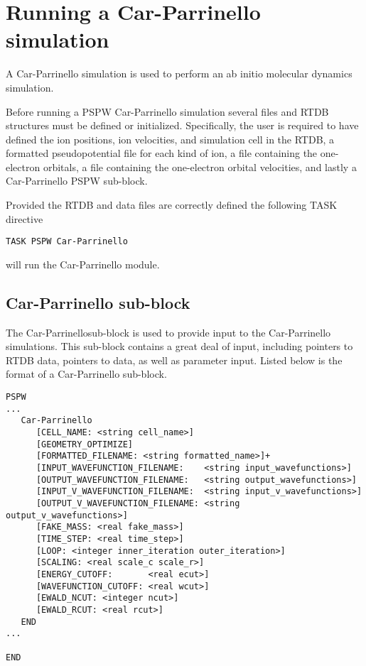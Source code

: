 \section{Running a Car-Parrinello simulation}

A Car-Parrinello simulation is used to perform an ab initio molecular
dynamics simulation.  

Before running a PSPW Car-Parrinello  simulation several files and
RTDB structures must be defined or initialized.  Specifically, the user 
is required to have defined the ion positions, ion velocities, and 
simulation cell in the RTDB, a formatted pseudopotential file for each 
kind of ion, a file containing the one-electron orbitals, a file containing 
the one-electron orbital velocities, and lastly a Car-Parrinello 
PSPW sub-block. 

Provided the RTDB and data files are correctly defined
the following TASK directive
\begin{verbatim}
TASK PSPW Car-Parrinello
\end{verbatim}
will run the Car-Parrinello module.


\subsection{Car-Parrinello  sub-block}
The Car-Parrinellosub-block is used to provide input to the
Car-Parrinello simulations.  This sub-block contains a great deal
of input, including pointers to RTDB data, pointers to data, as well as
parameter input.  Listed below is the format of a Car-Parrinello sub-block.
\begin{verbatim}
PSPW
...
   Car-Parrinello
      [CELL_NAME: <string cell_name>]
      [GEOMETRY_OPTIMIZE]
      [FORMATTED_FILENAME: <string formatted_name>]+
      [INPUT_WAVEFUNCTION_FILENAME:    <string input_wavefunctions>]
      [OUTPUT_WAVEFUNCTION_FILENAME:   <string output_wavefunctions>]
      [INPUT_V_WAVEFUNCTION_FILENAME:  <string input_v_wavefunctions>]
      [OUTPUT_V_WAVEFUNCTION_FILENAME: <string output_v_wavefunctions>]
      [FAKE_MASS: <real fake_mass>]
      [TIME_STEP: <real time_step>]
      [LOOP: <integer inner_iteration outer_iteration>]
      [SCALING: <real scale_c scale_r>]
      [ENERGY_CUTOFF:       <real ecut>]
      [WAVEFUNCTION_CUTOFF: <real wcut>]
      [EWALD_NCUT: <integer ncut>]
      [EWALD_RCUT: <real rcut>]
   END
...

END
\end{verbatim}

